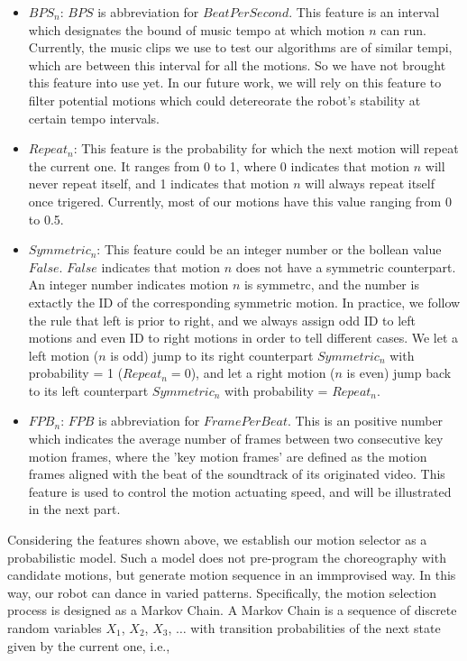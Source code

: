 \documentclass[UTF8,a4paper]{article}
\begin{document}
	\begin{itemize}
		\item $BPS_n$: $BPS$ is abbreviation for $BeatPerSecond$. This feature is an interval which designates the bound of music tempo at which motion $n$ can run. Currently, the music clips we use to test our algorithms are of similar tempi, which are between this interval for all the motions. So we have not brought this feature into use yet. In our future work, we will rely on this feature to filter potential motions which could detereorate the robot's stability at certain tempo intervals.

		\item $Repeat_n$: This feature is the probability for which the next motion will repeat the current one. It ranges from 0 to 1, where 0 indicates that motion $n$ will never repeat itself, and 1 indicates that motion $n$ will always repeat itself once trigered. Currently, most of our motions have this value ranging from 0 to 0.5.

		\item $Symmetric_n$: This feature could be an integer number or the bollean value $False$. $False$ indicates that motion $n$ does not have a symmetric counterpart. An integer number indicates motion $n$ is symmetrc, and the number is extactly the ID of the corresponding symmetric motion. In practice, we follow the rule that left is prior to right, and we always assign odd ID to left motions and even ID to right motions in order to tell different cases. We let a left motion ($n$ is odd) jump to its right counterpart $Symmetric_n$ with probability = 1 ($Repeat_n=0$), and let a right motion ($n$ is even) jump back to its left counterpart $Symmetric_n$ with probability = $Repeat_n$.

		\item $FPB_n$: $FPB$ is abbreviation for $FramePerBeat$. This is an positive number which indicates the average number of frames between two consecutive key motion frames, where the 'key motion frames' are defined as the motion frames aligned with the beat of the soundtrack of its originated video. This feature is used to control the motion actuating speed, and will be illustrated in the next part.
	\end{itemize}

	Considering the features shown above, we establish our motion selector as a probabilistic model. Such a model does not pre-program the choreography with candidate motions, but generate motion sequence in an immprovised way. In this way, our robot can dance in varied patterns. Specifically, the motion selection process is designed as a Markov Chain. A Markov Chain is a sequence of discrete random variables
	$X_1$, $X_2$, $X_3$, $\ldots$ with transition probabilities of the next state given by the current one, i.e.,
\end{document}
